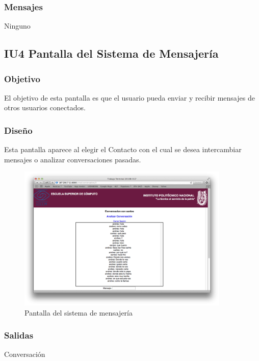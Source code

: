 \subsubsection{Mensajes}
Ninguno

		
	\pagebreak		%
	
	
	
		
		\subsection{IU4 Pantalla del Sistema de Mensajer\'ia}

\subsubsection{Objetivo}
	El objetivo de esta pantalla es que el usuario pueda enviar y recibir mensajes de otros usuarios conectados.

\subsubsection{Dise\~no}
	Esta pantalla aparece al elegir el Contacto con el cual se desea intercambiar mensajes o analizar conversaciones pasadas.

	\begin{figure}[htbp!]
		\centering
			\includegraphics[width=0.9\textwidth]{images/Modulo1/Chat}
		\caption{Pantalla del sistema de mensajer\'ia}
	\end{figure}

\subsubsection{Salidas}
Conversaci\'on


